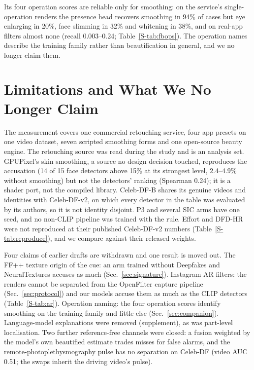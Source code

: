 \documentclass[conference]{IEEEtran}
\begin{document}
Its four operation scores are reliable only for smoothing: on the
service's single-operation renders the presence head recovers smoothing in 94\% of cases but eye
enlarging in 20\%, face slimming in 32\% and whitening in 38\%,
and on real-app filters almost none (recall 0.003--0.24; Table~\ref{S-tab:fbops}).
The operation names describe the training family rather than beautification in general, and we no longer claim them.

\section{Limitations and What We No Longer Claim}
\label{sec:limits}
The measurement covers one commercial retouching service, four app presets on one video dataset, seven scripted smoothing
forms and one open-source beauty engine. The retouching source was read during the study and is an analysis set. GPUPixel's skin smoothing, a source no design decision touched, reproduces the accusation (14 of 15 face detectors above 15\% at its strongest level, 2.4--4.9\% without smoothing) but not the detectors' ranking (Spearman 0.24); it is a shader port, not the compiled library.
 Celeb-DF-B shares its genuine videos
and identities with Celeb-DF-v2, on which every detector in the table was evaluated by its authors, so it is not identity
disjoint. P3 and several SIC arms have one seed, and no non-CLIP pipeline was trained with the rule. Effort and DFD-HR were
not reproduced at their published Celeb-DF-v2 numbers (Table~\ref{S-tab:reproduce}), and we compare against their released
weights.

Four claims of earlier drafts are withdrawn and one result is moved out. The FF++ texture origin of the cue: an arm trained
without Deepfakes and NeuralTextures accuses as much (Sec.~\ref{sec:signature}). Instagram AR filters: the renders cannot be separated from the OpenFilter
capture pipeline (Sec.~\ref{sec:protocol}) and our models accuse them as much as the CLIP detectors (Table~\ref{S-tab:ar}).
Operation naming: the four operation scores identify smoothing on the training family and little else (Sec.~\ref{sec:companion}). Language-model explanations were removed (supplement), as was part-level localisation.
Two further reference-free channels were closed: a fusion weighted by the model's own beautified estimate trades misses for
false alarms, and the remote-photoplethysmography pulse has no separation on Celeb-DF (video AUC 0.51; the swaps inherit the
driving video's pulse).
\end{document}
